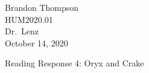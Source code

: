 \noindent
Brandon Thompson \\
HUM2020.01 \\
Dr.\ Lenz \\
October 14, 2020 \\

\begin{center}
Reading Response 4: Oryx and Crake
\end{center}
